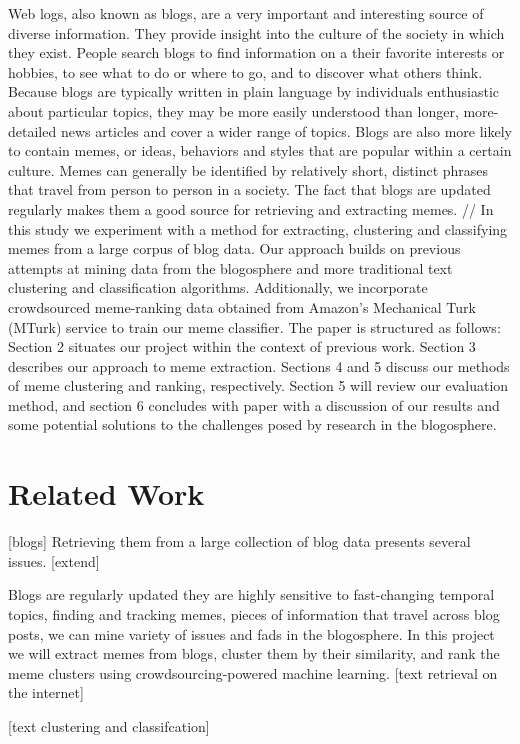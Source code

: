 \documentclass{sig-alternate}
\begin{document}
Web logs, also known as blogs, are a very important and interesting source of diverse information. They provide insight into the culture of the society in which they exist. People search blogs to find information on a their favorite interests or hobbies, to see what to do or where to go, and to discover what others think. Because blogs are typically written in plain language by individuals enthusiastic about particular topics, they may be more easily understood than longer, more-detailed news articles and cover a wider range of topics. Blogs are also more likely to contain memes, or ideas, behaviors and styles that are popular within a certain culture. Memes can generally be identified by relatively short, distinct phrases that travel from person to person in a society.  The fact that blogs are updated regularly makes them a good source for retrieving and extracting memes. 
//   In this study we experiment with a method for extracting, clustering and classifying memes from a large corpus of blog data.  Our approach builds on previous attempts at mining data from the blogosphere and more traditional text clustering and classification algorithms.  Additionally, we incorporate crowdsourced meme-ranking data obtained from Amazon's Mechanical Turk (MTurk) service to train our meme classifier.  The paper is structured as follows: Section 2 situates our project within the context of previous work.  Section 3 describes our approach to meme extraction.  Sections 4 and 5 discuss our methods of meme clustering and ranking, respectively.  Section 5 will review our evaluation method, and section 6 concludes with paper with a discussion of our results and some potential solutions to the challenges posed by research in the blogosphere.
\section{Related Work}
[blogs]
Retrieving them from a large collection of blog data presents several issues. [extend] 

Blogs are regularly updated they are highly sensitive to fast-changing temporal topics, finding and tracking memes, pieces of information that travel across blog posts, we can mine variety of issues and fads in the blogosphere. In this project we will extract memes from blogs, cluster them by their similarity, and rank the meme clusters using crowdsourcing-powered machine learning.
[text retrieval on the internet]

[text clustering and classifcation]
\end{document}
